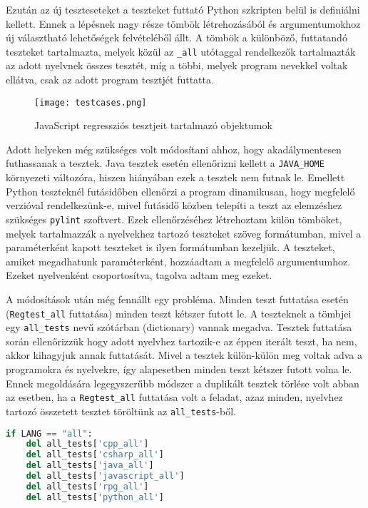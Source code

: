 Ezután az új teszteseteket a teszteket futtató Python szkripten belül is definiálni kellett.
Ennek a lépésnek nagy része tömbök létrehozásából és argumentumokhoz új választható lehetőségek felvételéből állt. A tömbök a különböző, futtatandó teszteket tartalmazta, melyek közül az \texttt{\_all} utótaggal rendelkezők tartalmazták az adott nyelvnek összes tesztét, míg a többi, melyek program nevekkel voltak ellátva, csak az adott program tesztjét futtatta.

\begin{figure}[!htbp]
    \caption{JavaScript regressziós tesztjeit tartalmazó objektumok}\label{fig:testcases}
    \centering
    \texttt{[image: testcases.png]}
\end{figure}

Adott helyeken még szükséges volt módosítani ahhoz, hogy akadálymentesen futhassanak a tesztek. Java tesztek esetén ellenőrizni kellett a \texttt{JAVA\_HOME} környezeti változóra, hiszen hiányában ezek a tesztek nem futnak le. Emellett Python teszteknél futásidőben ellenőrzi a program dinamikusan, hogy megfelelő verzióval rendelkezünk-e, mivel futásidő közben telepíti a teszt az elemzéshez szükséges \texttt{pylint} szoftvert.
Ezek ellenőrzéséhez létrehoztam külön tömböket, melyek tartalmazzák a nyelvekhez tartozó teszteket szöveg formátumban, mivel a paraméterként kapott teszteket is ilyen formátumban kezeljük.
A teszteket, amiket megadhatunk paraméterként, hozzáadtam a megfelelő argumentumhoz. Ezeket nyelvenként csoportosítva, tagolva adtam meg ezeket.

A módosítások után még fennállt egy probléma. Minden teszt futtatása esetén (\texttt{Regtest\_all} futtatása) minden teszt kétszer futott le. A teszteknek a tömbjei egy \texttt{all\_tests} nevű szótárban (dictionary) vannak megadva. Tesztek futtatása során ellenőrizzük hogy adott nyelvhez tartozik-e az éppen iterált teszt, ha nem, akkor kihagyjuk annak futtatását. Mivel a tesztek külön-külön meg voltak adva a programokra és nyelvekre, így alapesetben minden teszt kétszer futott volna le. Ennek megoldására legegyszerűbb módszer a duplikált tesztek törlése volt abban az esetben, ha a \texttt{Regtest\_all} futtatása volt a feladat, azaz minden, nyelvhez tartozó összetett tesztet töröltünk az \texttt{all\_tests}-ből. 

\pagebreak

\begin{lstlisting}[caption={Teszt törlési lépések},label={lst:abs-computedfiltering}, language={Python}]
if LANG == "all":
    del all_tests['cpp_all']
    del all_tests['csharp_all']
    del all_tests['java_all']
    del all_tests['javascript_all']
    del all_tests['rpg_all']
    del all_tests['python_all']
\end{lstlisting}